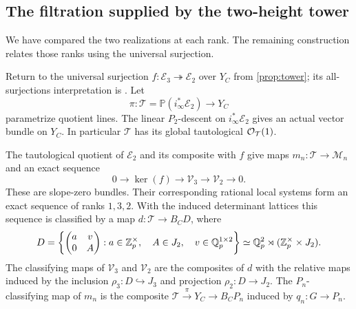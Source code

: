 \subsection{The filtration supplied by the two-height tower}

We have compared the two realizations at each rank. The remaining
construction relates those ranks using the universal surjection.

Return to the universal surjection
$f:\mathcal E_3\twoheadrightarrow\mathcal E_2$ over $Y_C$ from
\cref{prop:tower}; its all-surjections interpretation is
\cite[Proposition 2.7.1(3)]{BMR2026}.
Let
\[
 \pi:\mathcal T=\mathbb P(i_\infty^*\mathcal E_2)\longrightarrow Y_C
\]
parametrize quotient lines.  The linear $P_2$-descent on
$i_\infty^*\mathcal E_2$ gives an actual vector bundle on $Y_C$.
In particular $\mathcal T$ has its global tautological
$\mathcal O_{\mathcal T}(1)$.

\begin{proposition}\label{prop:filtered-modification}
The tautological quotient of $\mathcal E_2$ and its composite with $f$
give maps $m_n:\mathcal T\to\mathcal M_n$ and an exact sequence
\begin{equation}\label{eq:filtered-modification}
 0\longrightarrow\ker(f)\longrightarrow\mathcal V_3
       \longrightarrow\mathcal V_2\longrightarrow0 .
\end{equation}
These are slope-zero bundles.  Their corresponding rational local
systems form an exact sequence of ranks $1,3,2$.
With the induced determinant lattices this sequence is classified by
a map $d:\mathcal T\to B_CD$, where
\[
 D=\left\{
 \begin{pmatrix}a&v\\0&A\end{pmatrix}:
       a\in\mathbb Z_p^\times,\quad A\in J_2,\quad v\in\mathbb Q_p^{1\times2}
       \right\}
   \simeq\mathbb Q_p^2\rtimes(\mathbb Z_p^\times\times J_2).
\]
The classifying maps of $\mathcal V_3$ and $\mathcal V_2$ are the
composites of $d$ with the relative maps induced by the inclusion
$\rho_3:D\hookrightarrow J_3$ and projection $\rho_2:D\to J_2$.
The $P_n$-classifying map of $m_n$ is the composite
$\mathcal T\xrightarrow{\pi}Y_C\to B_CP_n$ induced by
$q_n:G\to P_n$.
\end{proposition}


